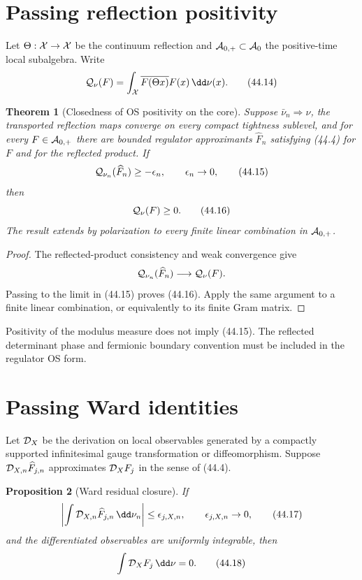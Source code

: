 \documentclass[11pt]{article}
\newtheorem{theorem}{Theorem}[section]
\newtheorem{proposition}[theorem]{Proposition}
\theoremstyle{remark}
\begin{document}
\section{Passing reflection positivity}

Let \(\Theta:{\cal X}\to{\cal X}\) be the continuum reflection and
\({\cal A}_{0,+}\subset{\cal A}_0\) the positive-time local
subalgebra.  Write
\[
 {\cal Q}_\nu(F)=
 \int_{\cal X}\overline{F(\Theta x)}F(x)\,\dd\nu(x).     \tag{44.14}
\]

\begin{theorem}[Closedness of OS positivity on the core]
\label{thm:v15v44-os}
Suppose \(\bar\nu_n\Rightarrow\nu\), the transported reflection
maps converge on every compact tightness sublevel, and for every
\(F\in{\cal A}_{0,+}\) there are bounded regulator
approximants \(\widehat F_n\) satisfying (44.4) for \(F\) and for
the reflected product.  If
\[
 {\cal Q}_{\nu_n}(\widehat F_n)\geq-\epsilon_n,
 \qquad\epsilon_n\to0,                                  \tag{44.15}
\]
then
\[
 {\cal Q}_{\nu}(F)\geq0.                                \tag{44.16}
\]
The result extends by polarization to every finite linear
combination in \({\cal A}_{0,+}\).
\end{theorem}

\begin{proof}
The reflected-product consistency and weak convergence give
\[
 {\cal Q}_{\nu_n}(\widehat F_n)\longrightarrow
 {\cal Q}_{\nu}(F).
\]
Passing to the limit in (44.15) proves (44.16).  Apply the same
argument to a finite linear combination, or equivalently to its
finite Gram matrix.
\end{proof}

Positivity of the modulus measure does not imply (44.15).  The
reflected determinant phase and fermionic boundary convention must
be included in the regulator OS form.

\section{Passing Ward identities}

Let \({\cal D}_X\) be the derivation on local observables generated
by a compactly supported infinitesimal gauge transformation or
diffeomorphism.  Suppose
\({\cal D}_{X,n}\widehat F_{j,n}\) approximates
\({\cal D}_XF_j\) in the sense of (44.4).

\begin{proposition}[Ward residual closure]
\label{prop:v15v44-ward}
If
\[
 \left|\int{\cal D}_{X,n}\widehat F_{j,n}\,\dd\nu_n\right|
 \leq\epsilon_{j,X,n},\qquad
 \epsilon_{j,X,n}\to0,                                  \tag{44.17}
\]
and the differentiated observables are uniformly integrable, then
\[
 \int{\cal D}_XF_j\,\dd\nu=0.                           \tag{44.18}
\]
\end{proposition}
\end{document}
